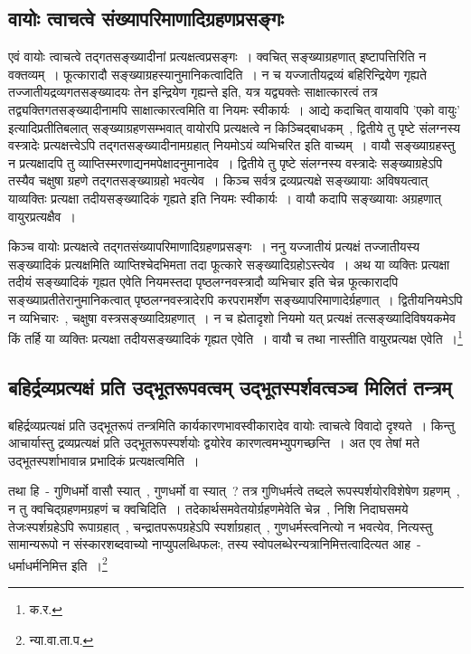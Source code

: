 		\subsection{वायोः त्वाचत्वे संख्यापरिमाणादिग्रहणप्रसङ्गः}

		एवं वायोः त्वाचत्वे तद्गतसङ्ख्यादीनां प्रत्यक्षत्वप्रसङ्गः~। क्वचित् सङ्ख्याग्रहणात् इष्टापत्तिरिति न वक्तव्यम्~। फूत्कारादौ सङ्ख्याग्रहस्यानुमानिकत्वादिति~। न च यज्जातीयद्रव्यं बहिरिन्द्रियेण गृह्यते तज्जातीयद्रव्यगतसङ्ख्यादयः तेन इन्द्रियेण गृह्यन्ते इति, यत्र यद्व्यक्तेः साक्षात्कारत्वं तत्र तद्व्यक्तिगतसङ्ख्यादीनामपि साक्षात्कारत्वमिति वा नियमः स्वीकार्यः~। आद्ये कदाचित् वायावपि 'एको वायुः' इत्यादिप्रतीतिबलात् सङ्ख्याग्रहणसम्भवात् वायोरपि प्रत्यक्षत्वे न किञ्चिद्बाधकम्~, द्वितीये तु पृष्टे संलग्नस्य वस्त्रादेः प्रत्यक्षत्त्वेऽपि तद्गतसङ्ख्यादीनामग्रहात् नियमोऽयं व्यभिचरित इति वाच्यम्~। वायौ सङ्ख्याग्रहस्तु न प्रत्यक्षादपि तु  व्याप्तिस्मरणाद्यनमपेक्षादनुमानादेव~। द्वितीये तु पृष्टे संलग्नस्य वस्त्रादेः‌ सङ्ख्याग्रहेऽपि तस्यैव चक्षुषा ग्रहणे तद्गतसङ्ख्याग्रहो भवत्येव~।‌ किञ्च सर्वत्र द्रव्यप्रत्यक्षे सङ्ख्यायाः अविषयत्वात् याव्यक्तिः प्रत्यक्षा तदीयसङ्ख्यादिकं गृह्यते इति नियमः स्वीकार्यः~। वायौ कदापि सङ्ख्यायाः अग्रहणात् वायुरप्रत्यक्षैव~।

		{\fontsize{11.7}{0}\selectfont\s किञ्च वायोः प्रत्यक्षत्वे तद्गतसंख्यापरिमाणादिग्रहणप्रसङ्गः~। ननु यज्जातीयं प्रत्यक्षं तज्जातीयस्य सङ्ख्यादिकं प्रत्यक्षमिति व्याप्तिश्चेदभिमता तदा फूत्कारे सङ्ख्यादिग्रहोऽस्त्येव~। अथ या व्यक्तिः प्रत्यक्षा तदीयं सङ्ख्यादिकं गृह्यत एवेति नियमस्तदा पृष्ठलग्नवस्त्रादौ व्यभिचार इति चेन्न फूत्कारादपि सङ्ख्याप्रतीतेरानुमानिकत्वात् पृष्ठलग्नवस्त्रादेरपि करपरामर्शेण सङ्ख्यापरिमाणादेर्ग्रहणात्~। द्वितीयनियमेऽपि न व्यभिचारः~, चक्षुषा वस्त्रसङ्ख्यादिग्रहणात्~। न च ह्येतादृशो नियमो  यत् प्रत्यक्षं तत्सङ्ख्यादिविषयकमेव किं तर्हि या व्यक्तिः प्रत्यक्षा तदीयसङ्ख्यादिकं गृह्यत एवेति~। वायौ च तथा नास्तीति वायुरप्रत्यक्ष एवेति~।\footnote{क.र.}}

		\subsection{बहिर्द्रव्यप्रत्यक्षं प्रति उद्भूतरूपवत्वम् उद्भूतस्पर्शवत्वञ्च मिलितं तन्त्रम्}

		बहिर्द्रव्यप्रत्यक्षं प्रति उद्भूतरूपं तन्त्रमिति कार्यकारणभावस्वीकारादेव वायोः त्वाचत्वे विवादो दृश्यते~। किन्तु आचार्यास्तु द्रव्यप्रत्यक्षं प्रति उद्भूतरूपस्पर्शयोः द्वयोरेव कारणत्वमभ्युपगच्छन्ति~। अत एव तेषां मते उद्भूतस्पर्शाभावान्न प्रभादिकं प्रत्यक्षत्वमिति~।

		{\fontsize{11.7}{0}\selectfont\s तथा हि~- गुणिधर्मो वासौ स्यात्~, गुणधर्मो वा स्यात्~? तत्र गुणिधर्मत्वे तब्दले रूपस्पर्शयोरविशेषेण ग्रहणम्~, न तु क्वचिद्ग्रहणमग्रहणं च क्वचिदिति~। तदेकार्थसमवेतयोर्ग्रहणमेवेति चेन्न~, निशि निदाघसमये तेजःस्पर्शग्रहेऽपि रूपाग्रहात्~, चन्द्रातपरूपग्रहेऽपि स्पर्शाग्रहात्~, गुणधर्मस्त्वनित्यो न भवत्येव, नित्यस्तु सामान्यरूपो न संस्कारशब्दवाच्यो नाप्युपलब्धिफलः, तस्य स्वोपलब्धेरन्यत्रानिमित्तत्वादित्यत आह~- धर्माधर्मनिमित्त इति~।\footnote{न्या.वा.ता.प.}}


